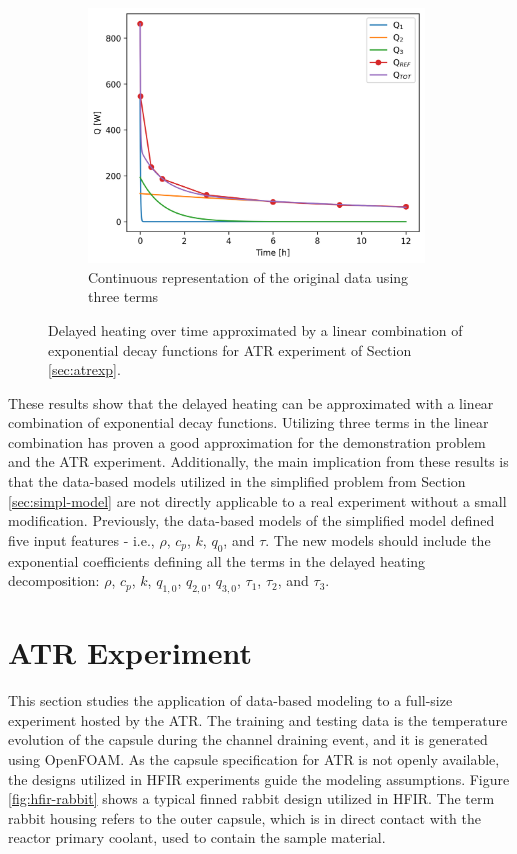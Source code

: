 \begin{figure}[htbp!]
\begin{subfigure}[b]{0.48\textwidth}
    \centering
    \includegraphics[width=0.98\textwidth]{figures/atr-13-deco-2}
    \caption{Continuous representation of the original data using three terms}
    \label{fig:modes-atr-c}
  \end{subfigure}
  \caption{Delayed heating over time approximated by a linear combination of exponential decay functions for ATR experiment of Section \ref{sec:atrexp}.}
  \label{fig:modes-atr}
\end{figure}

These results show that the delayed heating can be approximated with a linear combination of exponential decay functions.
Utilizing three terms in the linear combination has proven a good approximation for the demonstration problem and the ATR experiment.
Additionally, the main implication from these results is that the data-based models utilized in the simplified problem from Section \ref{sec:simpl-model} are not directly applicable to a real experiment without a small modification.
Previously, the data-based models of the simplified model defined five input features - i.e., $\rho$, $c_p$, $k$, $q_0$, and $\tau$.
The new models should include the exponential coefficients defining all the terms in the delayed heating decomposition: $\rho$, $c_p$, $k$, $q_{1,0}$, $q_{2,0}$, $q_{3,0}$, $\tau_1$, $\tau_2$, and $\tau_3$.


\section{ATR Experiment}
\label{sec:atr}

This section studies the application of data-based modeling to a full-size experiment hosted by the ATR.
The training and testing data is the temperature evolution of the capsule during the channel draining event, and it is generated using OpenFOAM.
As the capsule specification for ATR is not openly available, the designs utilized in \gls*{HFIR} experiments guide the modeling assumptions.
Figure \ref{fig:hfir-rabbit} shows a typical finned rabbit design utilized in HFIR.
The term rabbit housing refers to the outer capsule, which is in direct contact with the reactor primary coolant, used to contain the sample material.

